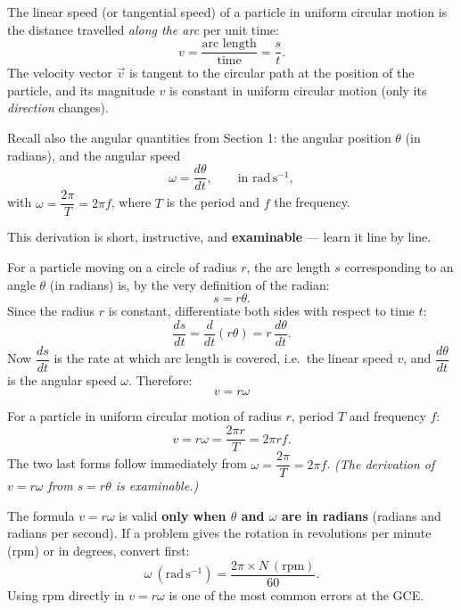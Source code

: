 \documentclass[11pt]{article}
\newcommand{\cle}[1]{{\popxbold\color{popdark}#1}}
\newcounter{popsec}
\newcounter{popsub}
\newcommand{\courssub}[1]{%
  \stepcounter{popsub}%
  \par\vspace{9pt}\noindent{\popxbold\fontsize{11.5}{13}\selectfont\color{popink}{\color{poporange}\thepopsec.\thepopsub}\hspace{6pt}#1}\par\nopagebreak\vspace{4pt}
}
\begin{document}
\begin{definition}
The \cle{linear speed} (or tangential speed) of a particle in uniform circular motion is the distance travelled \emph{along the arc} per unit time:
\[ v = \frac{\text{arc length}}{\text{time}} = \frac{s}{t}. \]
The velocity vector $\vec{v}$ is tangent to the circular path at the position of the particle, and its magnitude $v$ is constant in uniform circular motion (only its \emph{direction} changes).
\end{definition}

Recall also the angular quantities from Section 1: the angular position $\theta$ (in radians), and the angular speed
\[ \omega = \frac{d\theta}{dt}, \qquad \text{in } \mathrm{rad\,s^{-1}}, \]
with $\omega = \dfrac{2\pi}{T} = 2\pi f$, where $T$ is the period and $f$ the frequency.

\courssub{Derivation of $v = r\omega$}

This derivation is short, instructive, and \textbf{examinable} --- learn it line by line.

For a particle moving on a circle of radius $r$, the arc length $s$ corresponding to an angle $\theta$ (in radians) is, by the very definition of the radian:
\[ s = r\theta. \]
Since the radius $r$ is constant, differentiate both sides with respect to time $t$:
\[ \frac{ds}{dt} = \frac{d}{dt}(r\theta) = r\,\frac{d\theta}{dt}. \]
Now $\dfrac{ds}{dt}$ is the rate at which arc length is covered, i.e.\ the linear speed $v$, and $\dfrac{d\theta}{dt}$ is the angular speed $\omega$. Therefore:
\[ \boxed{\,v = r\omega\,} \]

\begin{propriete}
For a particle in uniform circular motion of radius $r$, period $T$ and frequency $f$:
\[ v = r\omega = \frac{2\pi r}{T} = 2\pi r f. \]
The two last forms follow immediately from $\omega = \dfrac{2\pi}{T} = 2\pi f$. \emph{(The derivation of $v = r\omega$ from $s = r\theta$ is examinable.)}
\end{propriete}

\begin{attention}
The formula $v = r\omega$ is valid \textbf{only when $\theta$ and $\omega$ are in radians} (radians and radians per second). If a problem gives the rotation in revolutions per minute (rpm) or in degrees, convert first:
\[ \omega\ (\mathrm{rad\,s^{-1}}) = \frac{2\pi \times N\ (\mathrm{rpm})}{60}. \]
Using rpm directly in $v = r\omega$ is one of the most common errors at the GCE.
\end{attention}
\end{document}
